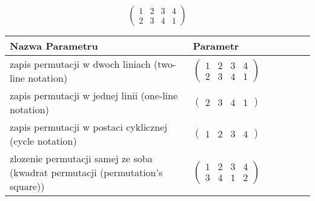 \documentclass[12pt]{article}
\begin{document}
\subsection{}
\begin{center}
\[
\begin{pmatrix}
	1 & 2 & 3 & 4 \\ 
	2 & 3 & 4 & 1 
\end{pmatrix}
\]

\begin{tabular}{|m{0.6\linewidth}|m{0.4\linewidth}|}
	\hline
	Nazwa Parametru & Parametr \\
	\hline
	zapis permutacji w dwoch liniach (two-line notation) & $\begin{pmatrix} 1 & 2 & 3 & 4 \\ 
2 & 3 & 4 & 1 \end{pmatrix}$ \\ 
	\hline
	zapis permutacji w jednej linii (one-line notation) & $\begin{pmatrix} 2 & 3 & 4 & 1 \end{pmatrix}$ \\ 
	\hline
	zapis permutacji w postaci cyklicznej (cycle notation) & $\begin{pmatrix} 1 & 2 & 3 & 4 \end{pmatrix} $ \\ 
	\hline
	zlozenie permutacji samej ze soba (kwadrat permutacji (permutation's square)) & $\begin{pmatrix} 1 & 2 & 3 & 4 \\ 
3 & 4 & 1 & 2 \end{pmatrix}$ \\ 
	\hline
\end{tabular}
\end{center}
\end{document}
